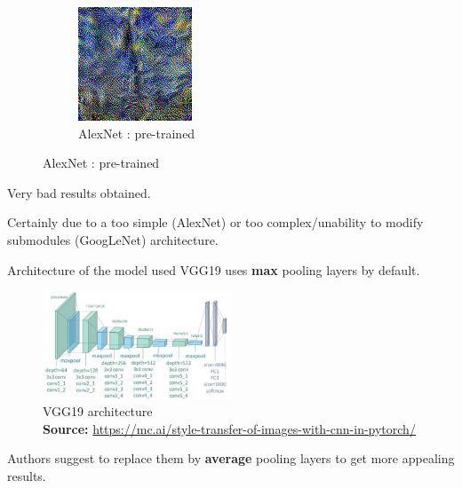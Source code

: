 \documentclass[12pt]{beamer}
\newcommand{\captionsource}[2]{
    \captionsetup{justification=centering}
    \caption*{#1\\\scriptsize\textbf{Source:} \url{#2}}
}
\begin{document}
\begin{frame}
\begin{figure}[H]
\begin{subfigure}[b]{0.45\textwidth}
                \includegraphics[width=\textwidth]{resources/gatys/models/alexnet.png}
                \caption{AlexNet : pre-trained}
            \end{subfigure}
        \end{figure}
        
        Very bad results obtained.
        
        \footnotesize{Certainly due to a too simple (AlexNet) or too complex/unability to modify submodules (GoogLeNet) architecture.}
    \end{frame}
    
    \begin{frame}{Architecture of the model used}
        VGG19 uses \textbf{max} pooling layers by default.
        
        \begin{figure}[H]
            \centering
            \includegraphics[width=0.5\textwidth]{resources/gatys/architecture/vgg19-architecture.png}
            \captionsource{VGG19 architecture}{https://mc.ai/style-transfer-of-images-with-cnn-in-pytorch/}
        \end{figure}

        Authors suggest to replace them by \textbf{average} pooling layers to get more appealing results.
    \end{frame}
    
\end{document}
